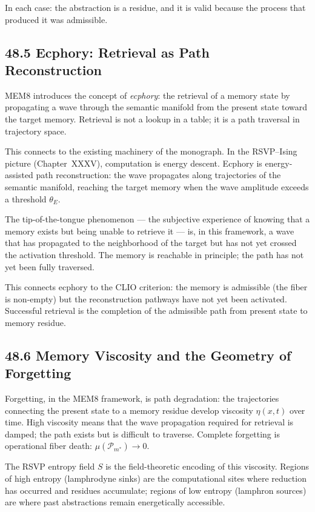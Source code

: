 \documentclass[12pt,letterpaper]{article}
\theoremstyle{remark}
\begin{document}
In each case: the abstraction is a residue, and it is valid because
the process that produced it was admissible.

\subsection{48.5 Ecphory: Retrieval as Path Reconstruction}

MEM\textbar{}8 introduces the concept of \emph{ecphory}: the
retrieval of a memory state by propagating a wave through the
semantic manifold from the present state toward the target
memory. Retrieval is not a lookup in a table; it is a path
traversal in trajectory space.

This connects to the existing machinery of the monograph. In the
RSVP--Ising picture (Chapter~XXXV), computation is energy descent.
Ecphory is energy-assisted path reconstruction: the wave propagates
along trajectories of the semantic manifold, reaching the target
memory when the wave amplitude exceeds a threshold $\theta_E$.

The tip-of-the-tongue phenomenon — the subjective experience of
knowing that a memory exists but being unable to retrieve it —
is, in this framework, a wave that has propagated to the
neighborhood of the target but has not yet crossed the activation
threshold. The memory is reachable in principle; the path has not
yet been fully traversed.

This connects ecphory to the CLIO criterion: the memory is
admissible (the fiber is non-empty) but the reconstruction pathways
have not yet been activated. Successful retrieval is the completion
of the admissible path from present state to memory residue.

\subsection{48.6 Memory Viscosity and the Geometry of Forgetting}

Forgetting, in the MEM\textbar{}8 framework, is path degradation:
the trajectories connecting the present state to a memory residue
develop viscosity $\eta(x,t)$ over time. High viscosity means that
the wave propagation required for retrieval is damped; the path
exists but is difficult to traverse. Complete forgetting is
operational fiber death: $\mu(\mathcal{P}_{m^*}) \to 0$.

The RSVP entropy field $S$ is the field-theoretic encoding of this
viscosity. Regions of high entropy (lamphrodyne sinks) are the
computational sites where reduction has occurred and residues
accumulate; regions of low entropy (lamphron sources) are where
past abstractions remain energetically accessible.
\end{document}
